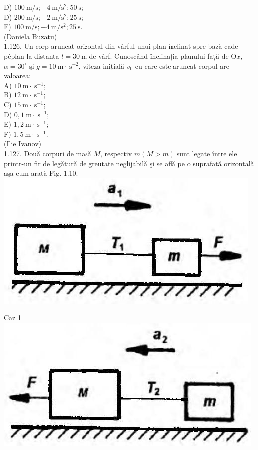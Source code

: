 \documentclass[10pt]{article}
\begin{document}
D) $100 \mathrm{~m} / \mathrm{s} ;+4 \mathrm{~m} / \mathrm{s}^{2} ; 50 \mathrm{~s}$;\\
D) $200 \mathrm{~m} / \mathrm{s} ;+2 \mathrm{~m} / \mathrm{s}^{2} ; 25 \mathrm{~s}$;\\
F) $100 \mathrm{~m} / \mathrm{s} ;-4 \mathrm{~m} / \mathrm{s}^{2} ; 25 \mathrm{~s}$.\\
(Daniela Buzatu)\\
1.126. Un corp aruncat orizontal din vârful unui plan înclinat spre bază cade péplan-la distanta $l=30 \mathrm{~m}$ de vârf. Cunoscând înclinația planului față de $\mathrm{O} x$, $\alpha=30^{\circ}$ şi $g=10 \mathrm{~m} \cdot \mathrm{~s}^{-2}$, viteza inițială $v_{0}$ cu care este aruncat corpul are valoarea:\\
A) $10 \mathrm{~m} \cdot \mathrm{~s}^{-1}$;\\
B) $12 \mathrm{~m} \cdot \mathrm{~s}^{-1}$;\\
C) $15 \mathrm{~m} \cdot \mathrm{~s}^{-1}$;\\
D) $0,1 \mathrm{~m} \cdot \mathrm{~s}^{-1}$;\\
E) $1,2 \mathrm{~m} \cdot \mathrm{~s}^{-1}$;\\
F) $1,5 \mathrm{~m} \cdot \mathrm{~s}^{-1}$.\\
(Ilie Ivanov)\\
1.127. Două corpuri de masă $M$, respectiv $m(M>m)$ sunt legate între ele printr-un fir de legătură de greutate neglijabilă şi se află pe o suprafață orizontală aşa cum arată Fig. 1.10.\\
\includegraphics[max width=\textwidth, center]{2025_07_01_5b3ff9fa0d508c8e9f17g-031(1)}

Caz 1\\
\includegraphics[max width=\textwidth, center]{2025_07_01_5b3ff9fa0d508c8e9f17g-031}
\end{document}
